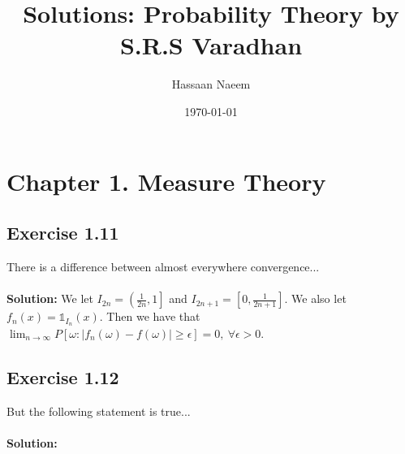 \documentclass{article}
\title{Solutions: Probability Theory by S.R.S Varadhan}
\author{Hassaan Naeem}
\date{\today}
\begin{document}
\maketitle

\section*{Chapter 1. Measure Theory}
\subsection*{Exercise 1.11}
There is a difference between almost everywhere convergence...
\\\\
\textbf{Solution:}
We let $I_{2n} = \left (\frac{1}{2n}, 1 \right ]$ and $I_{2n+1} = \left [ 0, \frac{1}{2n+1} \right ]$.
We also let $f_n(x) = \mathbb{1}_{I_n}(x)$.
Then we have that $\lim_{n\to\infty} P[\omega:|f_n(\omega)-f(\omega)| \ge \epsilon] = 0, \ \forall \epsilon >0$.

\subsection*{Exercise 1.12}
But the following statement is true...
\\\\
\textbf{Solution:}
\end{document}
